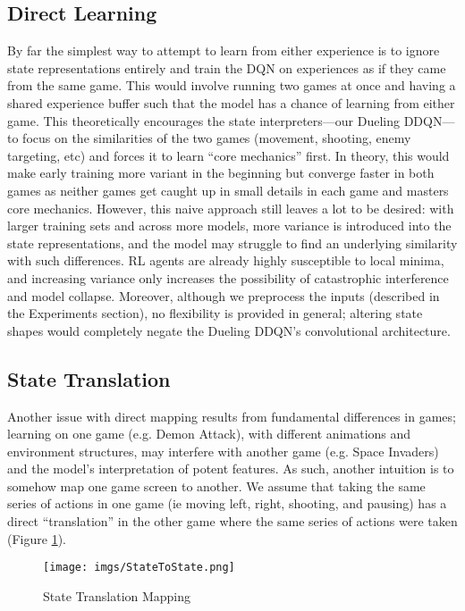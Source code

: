 \documentclass{article} %
\begin{document}
\subsection{Direct Learning}
By far the simplest way to attempt to learn from either experience is to ignore
state representations entirely and train the DQN on experiences as if they came from the same game.
This would involve running two games at once and having a shared experience buffer such that the
model has a chance of learning from either game. This theoretically encourages the state
interpreters---our Dueling DDQN---to focus on the similarities of the two games (movement, shooting,
enemy targeting, etc) and forces it to learn ``core mechanics'' first. In theory, this would make
early training more variant in the beginning but converge faster in both games as neither games get
caught up in small details in each game and masters core mechanics. However, this naive approach
still leaves a lot to be desired: with larger training sets and across more models, more variance is
introduced into the state representations, and the model may struggle to find an underlying
similarity with such differences. RL agents are already highly susceptible to local minima, and
increasing variance only increases the possibility of catastrophic interference and model collapse.
Moreover, although we preprocess the inputs (described in the Experiments section), no flexibility
is provided in general; altering state shapes would completely negate the Dueling DDQN's
convolutional architecture.

\subsection{State Translation}
Another issue with direct mapping results from fundamental differences in games; learning on one
game (e.g. Demon Attack), with different animations and environment structures, may interfere with
another game (e.g. Space Invaders) and the model's interpretation of potent features.  As such,
another intuition is to somehow map one game screen to another. We assume that taking the same
series of actions in one game (ie moving left, right, shooting, and pausing) has a direct
``translation'' in the other game where the same series of actions were taken (Figure
\ref{fig:imgs-StateToState}).

\begin{figure}[htpb]
  \centering
  \texttt{[image: imgs/StateToState.png]}
  \caption{State Translation Mapping}
  \label{fig:imgs-StateToState}
\end{figure}
\end{document}
